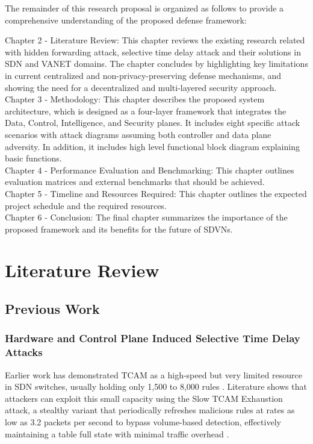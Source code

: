 \documentclass[12pt, a4paper]{report}
\begin{document}
The remainder of this research proposal is organized as follows to provide a comprehensive understanding of the proposed defense framework:

Chapter 2 - Literature Review:
This chapter reviews the existing research related with hidden forwarding  attack, selective time delay attack and their solutions in SDN and VANET domains. The chapter concludes by highlighting key limitations in current centralized and non-privacy-preserving defense mechanisms, and showing  the need for a decentralized and multi-layered security approach.
\\ 

Chapter 3 - Methodology:
This chapter describes the proposed system architecture, which is designed as a four-layer framework that integrates the Data, Control, Intelligence, and Security planes. It includes eight specific attack scenarios with attack diagrams assuming both controller and data plane adversity. In addition, it includes high level functional block diagram explaining basic functions.
\\
Chapter 4 - Performance Evaluation and Benchmarking:
This chapter outlines evaluation matrices and external benchmarks that should be achieved.
\\
Chapter 5 - Timeline and Resources Required:
This chapter outlines the expected project schedule and the required resources.
\\
Chapter 6 - Conclusion:
The final chapter summarizes the importance of the proposed framework and its benefits for the future of SDVNs.


\chapter{Literature Review}
\section{Previous Work}

\subsection{Hardware and Control Plane Induced Selective Time Delay Attacks}

Earlier work has demonstrated TCAM as a high-speed but very limited resource in SDN switches, usually holding only 1,500 to 8,000 rules \cite{PASCOAL2020107223}. Literature shows that attackers can exploit this small capacity using the Slow TCAM Exhaustion attack, a stealthy variant that periodically refreshes malicious rules at rates as low as 3.2 packets per second to bypass volume-based detection, effectively maintaining a table full state with minimal traffic overhead \cite{PASCOAL2020107223} \cite{pascoal2017slow}. 
\end{document}

